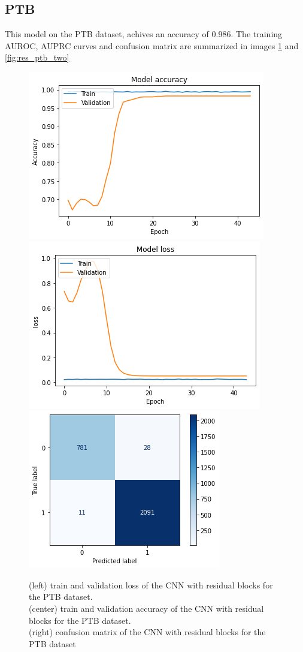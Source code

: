 \documentclass[11pt]{scrartcl}
\begin{document}
\subsection{PTB}
This model on the PTB dataset, achives an accuracy of 0.986. The training AUROC, AUPRC curves and confusion matrix  are summarized in images \ref{fig:res_ptb_three} and \ref{fig:res_ptb_two}
\begin{figure}[htp]
\centering
\includegraphics[width=.30\textwidth]{../models_performance_graphs/ptb/res_net_ptb_accuracy.png}\hfill
\includegraphics[width=.30\textwidth]{../models_performance_graphs/ptb/res_net_ptb_loss.png}\hfill
\includegraphics[width=.30\textwidth]{../models_performance_graphs/ptb/res_net_ptb_confusion.png}
\caption{(left) train and validation loss of the CNN with residual blocks for the PTB dataset. \\ (center) train and validation accuracy of the CNN with residual blocks for the PTB dataset. \\(right) confusion matrix of the CNN with residual blocks for the PTB dataset}
\label{fig:res_ptb_three}
\end{figure}
\end{document}
